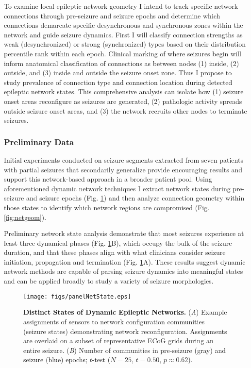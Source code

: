 To examine local epileptic network geometry I intend to track specific network connections through pre-seizure and seizure epochs and determine which connections demarcate specific desynchronous and synchronous zones within the network and guide seizure dynamics. First I will classify connection strengths as weak (desynchronized) or strong (synchronized) types based on their distribution percentile rank within each epoch. Clinical marking of where seizures begin will inform anatomical classification of connections as between nodes (1) inside, (2) outside, and (3) inside and outside the seizure onset zone. Thus I propose to study prevalence of connection type and connection location during detected epileptic network states. This comprehensive analysis can isolate how (1) seizure onset areas reconfigure as seizures are generated, (2) pathologic activity spreads outside seizure onset areas, and (3) the network recruits other nodes to terminate seizures.

\subsubsection{Preliminary Data}
Initial experiments conducted on seizure segments extracted from seven patients with partial seizures that secondarily generalize provide encouraging results and support this network-based approach in a broader patient pool. Using aforementioned dynamic network techniques I extract network states during pre-seizure and seizure epochs (Fig. \ref{fig:netstate}) and then analyze connection geometry within those states to identify which network regions are compromised (Fig. \ref{fig:netgeom}).

Preliminary network state analysis demonstrate that most seizures experience at least three dynamical phases (Fig. \ref{fig:netstate}B), which occupy the bulk of the seizure duration, and that these phases align with what clinicians consider seizure initiation, propagation and termination (Fig. \ref{fig:netstate}A). These results suggest dynamic network methods are capable of parsing seizure dynamics into meaningful states and can be applied broadly to study a variety of seizure morphologies.

\begin{figure}[t]
\centering
\texttt{[image: figs/panelNetState.eps]}
\caption[Dynamic epileptic network states]{\textbf{Distinct States of Dynamic Epileptic Networks.} (\textit{A}) Example assignments of sensors to network configuration communities (seizure states) demonstrating network reconfiguration. Assignments are overlaid on a subset of representative ECoG grids during an entire seizure. (\textit{B}) Number of communities in pre-seizure (gray) and seizure (blue) epochs; $t$-test ($N=25$, $t=0.50$, $p\approx0.62$).}
\label{fig:netstate}
\end{figure}


